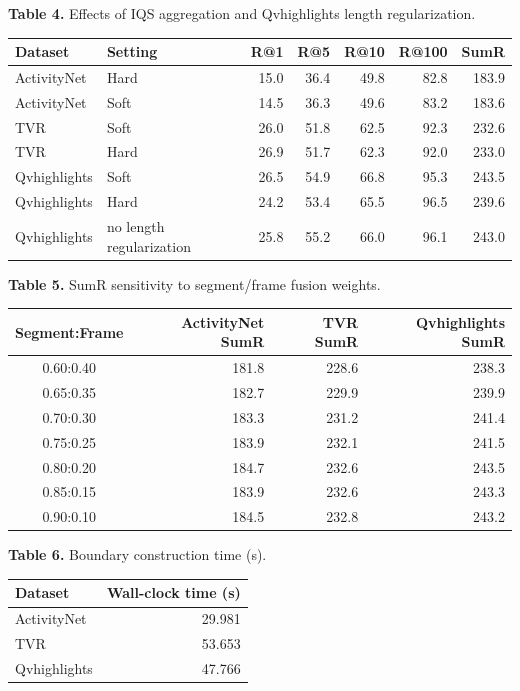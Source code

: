 \documentclass[10pt]{article}
\newcommand{\tablecaption}[2]{\begin{center}\footnotesize\textbf{Table #1.} #2\end{center}\vspace{-7pt}}
\begin{document}
\or
\tablecaption{4}{Effects of IQS aggregation and Qvhighlights length regularization.}
\begin{center}\small
\begin{tabular}{l l r r r r r}
\toprule
Dataset & Setting & R@1 & R@5 & R@10 & R@100 & SumR \\
\midrule
ActivityNet & Hard & 15.0 & 36.4 & 49.8 & 82.8 & 183.9 \\
ActivityNet & Soft & 14.5 & 36.3 & 49.6 & 83.2 & 183.6 \\
TVR & Soft & 26.0 & 51.8 & 62.5 & 92.3 & 232.6 \\
TVR & Hard & 26.9 & 51.7 & 62.3 & 92.0 & 233.0 \\
Qvhighlights & Soft & 26.5 & 54.9 & 66.8 & 95.3 & 243.5 \\
Qvhighlights & Hard & 24.2 & 53.4 & 65.5 & 96.5 & 239.6 \\
Qvhighlights & no length regularization & 25.8 & 55.2 & 66.0 & 96.1 & 243.0 \\
\bottomrule
\end{tabular}
\end{center}
\or
\tablecaption{5}{SumR sensitivity to segment/frame fusion weights.}
\begin{center}\small
\begin{tabular}{c r r r}
\toprule
Segment:Frame & ActivityNet SumR & TVR SumR & Qvhighlights SumR \\
\midrule
0.60:0.40 & 181.8 & 228.6 & 238.3 \\
0.65:0.35 & 182.7 & 229.9 & 239.9 \\
0.70:0.30 & 183.3 & 231.2 & 241.4 \\
0.75:0.25 & 183.9 & 232.1 & 241.5 \\
0.80:0.20 & 184.7 & 232.6 & 243.5 \\
0.85:0.15 & 183.9 & 232.6 & 243.3 \\
0.90:0.10 & 184.5 & 232.8 & 243.2 \\
\bottomrule
\end{tabular}
\end{center}
\or
\tablecaption{6}{Boundary construction time (s).}
\begin{center}\small
\begin{tabular}{l r}
\toprule
Dataset & Wall-clock time (s) \\
\midrule
ActivityNet & 29.981 \\
TVR & 53.653 \\
Qvhighlights & 47.766 \\
\bottomrule
\end{tabular}
\end{center}
\end{document}
